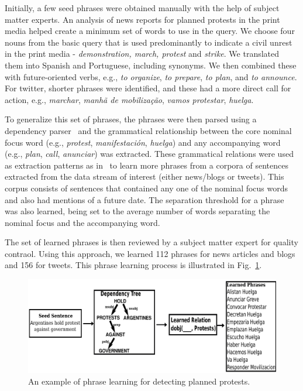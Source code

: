 Initially, a few seed phrases were obtained manually
with the help of subject matter experts.
An analysis of news reports for planned protests in the print media helped create a
minimum set of words to use in the query.  We choose four nouns from
the basic query that is used predominantly to indicate a civil unrest
in the print media - {\em demonstration, march, protest} and
{\it strike}. We translated them into Spanish and Portuguese, including
synonyms.  We then combined these with future-oriented verbs, e.g., {\em to organize}, {\em to prepare}, {\em to
plan}, and {\em to announce}. For twitter, shorter phrases were identified, and these had
a more direct call for action, e.g., {\em marchar}, {\em manhã de mobilização}, {\em
  vamos protestar}, {\em huelga}.

To generalize this set of phrases, the phrases were then parsed
using a dependency parser~\cite{freeling} and the grammatical
relationship between the core nominal focus word (e.g., {\em protest}, 
{\em manifestación}, {\em huelga}) and any accompanying
word (e.g., {\em plan}, {\em call}, {\em anunciar}) was
extracted. These grammatical relations were used as extraction
patterns as in~\cite{riloff2003learning} to learn more phrases from a
corpora of sentences extracted from the data stream of interest
(either news/blogs or tweets). This corpus consists of sentences that
contained any one of the nominal focus words and also had mentions of
a future date. The separation threshold for a phrase was also
learned, being set to the average number of words separating
the nominal focus and the accompanying word.

The set of learned phrases is then reviewed by a subject matter expert for quality contraol.  
Using this approach, we learned 112 phrases for news articles and blogs and 156 for tweets.  
This phrase learning process is illustrated in Fig.~\ref{fig:phraselearning}.

\begin{figure}
\centering
\includegraphics[scale=0.4]{figures/phraseLearning}
\caption{An example of phrase learning for detecting planned protests.}
\label{fig:phraselearning}
\end{figure}

